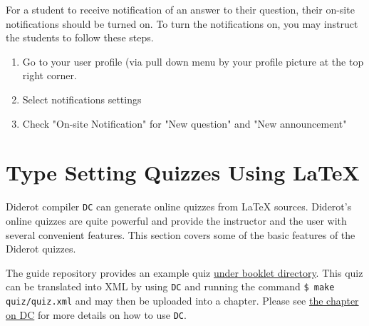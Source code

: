 \begin{cluster}
\label{grp:grm:quiz::on-site-notifications}

\begin{gram}
\label{grm:quiz::on-site-notifications}
For a student to receive notification of an answer to their question,
their on-site notifications should be turned on.  
To turn the notifications on, you may instruct the students to follow
these steps.
\begin{enumerate}
\item  Go to your user profile (via pull down menu by your profile picture at the top right corner. 

\item Select notifications settings

\item Check "On-site Notification" for "New question" and "New announcement"
\end{enumerate}

\end{gram}
\end{cluster}


\section{Type Setting Quizzes Using LaTeX}
\label{ch:quiz::typesetting}

\begin{cluster}
\label{grp:grm:quiz::compiler}

\begin{gram}
\label{grm:quiz::compiler}
Diderot compiler \lstinline`DC` can generate online quizzes from LaTeX sources. Diderot’s online quizzes are quite powerful and provide the instructor and the user with several convenient features. This section covers some of the basic features of the Diderot quizzes.  

\end{gram}
\end{cluster}

\begin{cluster}
\label{grp:grm:quiz::guide}

\begin{gram}
\label{grm:quiz::guide}
The guide repository provides an example quiz 
\href{https://github.com/diderot-edu/diderot-guide/tree/master/booklet}{under booklet directory}. 
This quiz can be translated into XML by using \lstinline`DC` and running the command 
\lstinline`$ make quiz/quiz.xml`
and may then be uploaded into a chapter. 
Please see \href{ch:dc}{the chapter on DC} for more details on how to use \lstinline`DC`.

\end{gram}
\end{cluster}


